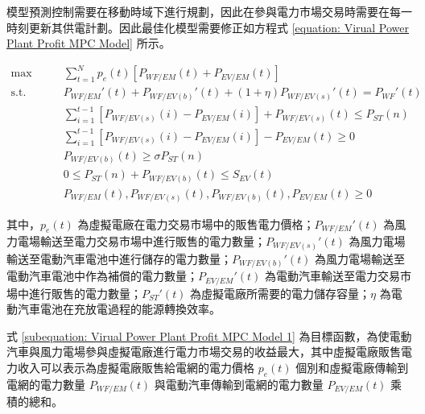 模型預測控制需要在移動時域下進行規劃，因此在參與電力市場交易時需要在每一時刻更新其供電計劃。因此最佳化模型需要修正如方程式 \eqref{equation: Virual Power Plant Profit MPC Model} 所示。

\begin{subequations}\label{equation: Virual Power Plant Profit MPC Model}
  \begin{alignat}{2}
    \max        \qquad & \sum_{t = 1}^{N} p_{e}(t) [P_{WF/EM}(t) + P_{EV/EM}(t)]      \label{subequation: Virual Power Plant Profit MPC Model 1} \\
    \text{s.t.} \qquad & P_{WF/EM}'(t) + P_{WF/EV(b)}'(t) + (1 + \eta)P_{WF/EV(s)}'(t) = P_{WF}'(t) \label{subequation: Virual Power Plant Profit MPC Model 2} \\
                       & \sum_{i=1}^{t-1} \left[ P_{WF/EV(s)}(i) - P_{EV/EM}(i) \right] + P_{WF/EV(s)}(t) \leq P_{ST}(n)                    \label{subequation: Virual Power Plant Profit MPC Model 3} \\
                       & \sum_{i=1}^{t-1} \left[ P_{WF/EV(s)}(i) - P_{EV/EM}(i) \right] - P_{EV/EM}(t) \geq 0                       \label{subequation: Virual Power Plant Profit MPC Model 4} \\
                       & P_{WF/EV(b)}(t) \geq \sigma P_{ST}(n)                         \label{subequation: Virual Power Plant Profit MPC Model 5} \\
                       & 0 \leq P_{ST}(n) + P_{WF/EV(b)}(t) \leq S_{EV}(t)             \label{subequation: Virual Power Plant Profit MPC Model 6} \\
                       & P_{WF/EM}(t), P_{WF/EV(s)}(t),  P_{WF/EV(b)}(t),P_{EV/EM}(t) \geq 0                 \label{subequation: Virual Power Plant Profit MPC Model 7}      
  \end{alignat}
\end{subequations}

其中，$p_{e} (t)$ 為虛擬電廠在電力交易市場中的販售電力價格；$P_{WF/EM}'(t)$ 為風力電場輸送至電力交易市場中進行販售的電力數量；$P_{WF/EV(s)}'(t)$ 為風力電場輸送至電動汽車電池中進行儲存的電力數量；$P_{WF/EV(b)}'(t)$ 為風力電場輸送至電動汽車電池中作為補償的電力數量；$P_{EV/EM}'(t)$ 為電動汽車輸送至電力交易市場中進行販售的電力數量；$P_{ST}'(t)$ 為虛擬電廠所需要的電力儲存容量；$\eta$ 為電動汽車電池在充放電過程的能源轉換效率。

式 \eqref{subequation: Virual Power Plant Profit MPC Model 1} 為目標函數，為使電動汽車與風力電場參與虛擬電廠進行電力市場交易的收益最大，其中虛擬電廠販售電力收入可以表示為虛擬電廠販售給電網的電力價格 $p_{e} (t)$ 個別和虛擬電廠傳輸到電網的電力數量 $P_{WF/EM}(t)$ 與電動汽車傳輸到電網的電力數量 $P_{EV/EM}(t)$ 乘積的總和。

